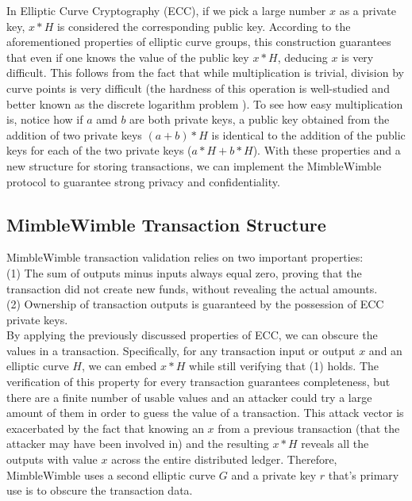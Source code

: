 \documentclass{amsart}
\theoremstyle{definition}
\numberwithin{equation}{section}
\begin{document}
In Elliptic Curve Cryptography (ECC), if we pick a large number $x$ as a private key, $x*H$ is considered the corresponding public key. According to the aforementioned properties of elliptic curve groups, this construction guarantees that even if one knows the value of the public key $x*H$, deducing $x$ is very difficult. This follows from the fact that while multiplication is trivial, division by curve points is very difficult (the hardness of this operation is well-studied and better known as the discrete logarithm problem \cite{5}). To see how easy multiplication is, notice how if $a$ amd $b$ are both private keys, a public key obtained from the addition of two private keys $(a+b)*H$ is identical to the addition of the public keys for each of the two private keys ($a*H + b*H$). With these properties and a new structure for storing transactions, we can implement the MimbleWimble protocol to guarantee strong privacy and confidentiality.

\subsection{MimbleWimble Transaction Structure}

MimbleWimble transaction validation relies on two important properties: \\
(1) The sum of outputs minus inputs always equal zero, proving that the transaction did not create new funds, without revealing the actual amounts.\\
(2) Ownership of transaction outputs is guaranteed by the possession of ECC private keys.\\

By applying the previously discussed properties of ECC, we can obscure the values in a transaction. Specifically, for any transaction input or output $x$ and an elliptic curve $H$, we can embed $x*H$ while still verifying that (1) holds. The verification of this property for every transaction guarantees completeness, but there are a finite number of usable values and an attacker could try a large amount of them in order to guess the value of a transaction. This attack vector is exacerbated by the fact that knowing an $x$ from a previous transaction (that the attacker may have been involved in) and the resulting $x*H$ reveals all the outputs with value $x$ across the entire distributed ledger. Therefore, MimbleWimble uses a second elliptic curve $G$ and a private key $r$ that's primary use is to obscure the transaction data.\\
\end{document}
